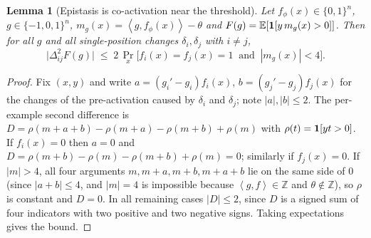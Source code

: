 \documentclass[11pt,a4paper]{article}
\theoremstyle{definition}
\theoremstyle{plain}
\newtheorem{lemma}[definition]{Lemma}
\theoremstyle{remark}
\newcommand{\E}{\mathbb{E}}
\newcommand{\ind}[1]{\one\!\left[#1\right]}
\newcommand{\ip}[2]{\left\langle #1, #2 \right\rangle}
\begin{document}
\begin{lemma}[Epistasis is co-activation near the threshold]
\label{lem:epistasis}
Let $f_\phi(x)\in\{0,1\}^n$, $g\in\{-1,0,1\}^n$, $m_g(x) = \ip{g}{f_\phi(x)}-\theta$ and $F(g) = \E[\ind{y\,m_g(x)>0}]$. Then for all $g$ and all single-position changes $\delta_i,\delta_j$ with $i\neq j$,
\begin{equation}
\big|\Delta^2_{ij}F(g)\big| \;\le\; 2\,\Pr_x\Big[f_i(x)=f_j(x)=1\ \text{ and }\ |m_g(x)| < 4\Big].
\end{equation}
\end{lemma}
\begin{proof}
Fix $(x,y)$ and write $a = (g_i'-g_i)f_i(x)$, $b = (g_j'-g_j)f_j(x)$ for the changes of the pre-activation caused by $\delta_i$ and $\delta_j$; note $|a|,|b|\le 2$. The per-example second difference is
$D = \rho(m+a+b)-\rho(m+a)-\rho(m+b)+\rho(m)$ with $\rho(t)=\ind{yt>0}$.
If $f_i(x)=0$ then $a=0$ and $D=\rho(m+b)-\rho(m)-\rho(m+b)+\rho(m)=0$; similarly if $f_j(x)=0$.
If $|m|> 4$, all four arguments $m, m+a, m+b, m+a+b$ lie on the same side of $0$ (since $|a+b|\le 4$, and $|m|=4$ is impossible because $\ip{g}{f}\in\mathbb{Z}$ and $\theta\notin\mathbb{Z}$), so $\rho$ is constant and $D=0$.
In all remaining cases $|D|\le 2$, since $D$ is a signed sum of four indicators with two positive and two negative signs. Taking expectations gives the bound.
\end{proof}
\end{document}
